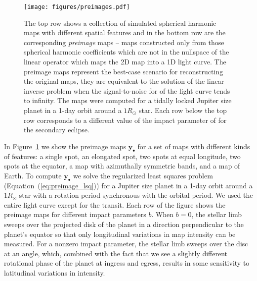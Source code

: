 \documentclass[12pt,dvipsnames]{report}
\begin{document}
\begin{figure}[t!]
    \begin{centering}
        \texttt{[image: figures/preimages.pdf]}
        \caption{
            The top row shows a collection of simulated spherical harmonic maps with different spatial
            features and in the bottom row are the corresponding \emph{preimage} maps -- maps
            constructed only from those spherical harmonic coefficients which are not in the
            nullspace of the linear operator which maps the 2D map into a 1D light curve.
            The preimage maps represent the best-case scenario for reconstructing the original
            maps, they are equivalent to the solution of the linear inverse problem when the signal-to-noise for
            of the light curve tends to infinity.
            The maps were computed for a tidally locked Jupiter size planet in a 1-day orbit around a
            $1R_\odot$ star.
            Each row below the top row corresponds to a different value of the impact parameter of
            for the secondary eclipse.
        }
        \label{fig:preimages:1}
    \end{centering}
\end{figure}

In Figure~\ref{fig:preimages:1} we show the preimage maps
$\mathbf{y}_{\bullet}$ for a set of maps with different kinds of features: a
single spot, an elongated spot, two spots at equal longitude, two spots at the
equator, a map with azimuthally symmetric bands, and a map of Earth. To compute
$\mathbf{y}_{\bullet}$ we solve the regularized least squares problem
(Equation~(\ref{eq:preimage_lsq})) for a Jupiter size planet in a 1-day orbit
around a $1R_\odot$ star with a rotation period synchronous with the orbital
period. We used the entire light curve except for the transit. 
Each row of the figure shows the preimage maps for different impact parameters $b$.
When $b=0$, the stellar limb sweeps over the projected disk of the planet in a
direction perpendicular to the planet's equator so that only longitudinal
variations in map intensity can be measured. For a nonzero impact parameter,
the stellar limb sweeps over the disc at an angle, which, combined with the
fact that we see a slightly different rotational phase of the planet at
ingress and egress, results in some sensitivity to latitudinal variations in
intensity.
\end{document}
